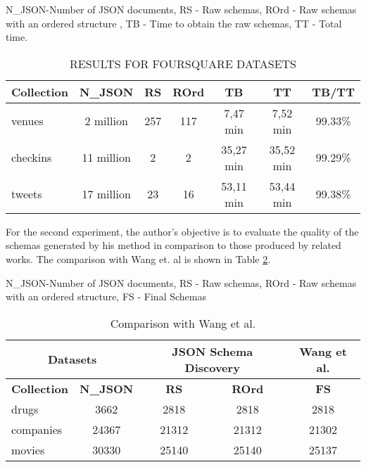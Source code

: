 \documentclass[sigconf, nonacm]{acmart}
\begin{document}
\begin{table}[h]
\centering
\caption{RESULTS FOR FOURSQUARE DATASETS \cite{frozza2018approach}} 

N\_JSON-Number of JSON documents, RS - Raw schemas, ROrd - Raw schemas with an ordered structure
, TB - Time to obtain the raw schemas, TT - Total time. \vspace{5pt}

\scalebox{0.85} {
\begin{tabular}{|l|c|c|c|c|c|c|}
\hline
\textbf{Collection} & \textbf{N\_JSON} & \textbf{RS} & \textbf{ROrd} & \textbf{TB}      & \textbf{TT}   & \textbf{TB/TT}        \\ \hline
venues              & 2 million        & 257         & 117            & 7,47 min         & 7,52 min  &99.33\%        \\ \hline 
checkins            & 11 million       & 2           & 2              & 35,27 min        & 35,52 min  &99.29\%      \\ \hline
tweets              & 17 million       & 23          & 16             & 53,11 min        & 53,44 min   &99.38\%     \\ \hline
\end{tabular}
}

\label{table:exp1}
\end{table}

For the second experiment, the author's objective is to evaluate the quality of the schemas generated by his method in comparison to those produced by related works. The comparison with Wang et. al \cite{wang2015schema} is shown in Table \ref{table:exp2}.

\begin{table}
\centering
\caption{Comparison with Wang et al. \cite{wang2015schema}}

N\_JSON-Number of JSON documents, RS - Raw schemas, ROrd - Raw schemas with an ordered structure, FS - Final Schemas  \vspace{5pt}

\scalebox{0.85} {
\begin{tabular}{|l|c|c|c|c|}
\hline
\multicolumn{2}{|c|}{\textbf{Datasets}} & \multicolumn{2}{c|}{\textbf{JSON Schema Discovery}} & \textbf{Wang et al.} \cite{wang2015schema}\\
\hline
\textbf{Collection} & \textbf{N\_JSON} & \textbf{RS} & \textbf{ROrd} & \textbf{FS} \\
\hline 
drugs   &   3662    &   2818    &   2818    &   2818 \\
\hline
companies & 24367 & 21312 & 21312 & 21302 \\
\hline
movies & 30330 & 25140 & 25140 & 25137 \\
\hline
\end{tabular}
}
\label{table:exp2}
\end{table}
\end{document}
